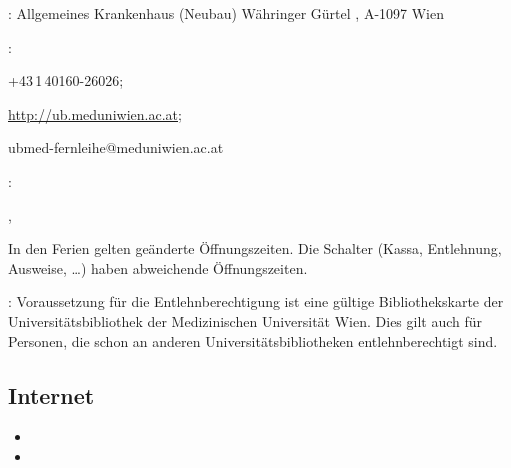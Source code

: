 {%
\begin{compactitem}
  \item {}: Allgemeines Krankenhaus (Neubau)
  Währinger Gürtel , A-1097 Wien
  \item {}:
  \begin{inparadesc}
    \item[Tel.] +43\,1\,40160-26026;
    \item[WWW] \url{http://ub.meduniwien.ac.at};
    \item[E-Mail für Fernleihebestellungen] ubmed-fernleihe@meduniwien.ac.at
  \end{inparadesc}
  \item {}:
  \begin{inparadesc}
    \item[\VonBis{Mo}{Fr}] ,
    \item[Sa] 
    \item[Sonst.:] In den Ferien gelten geänderte
    Öffnungszeiten. Die Schalter (Kassa, Entlehnung,
    Ausweise, \ldots) haben abweichende Öffnungszeiten.
  \end{inparadesc}
  \item {}: Voraussetzung für die
  Entlehnberechtigung ist eine gültige Bibliothekskarte der
  Universitätsbibliothek der Medizinischen Universität Wien.
  Dies gilt auch für Personen, die schon an anderen
  Universitätsbibliotheken entlehnberechtigt sind.
\end{compactitem}
}{}{}{}{}















% 


\subsection{Internet}






\begin{itemize}
  \item %
  \item {}
\end{itemize}


